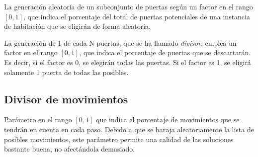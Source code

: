 La generación aleatoria de un subconjunto de puertas según un factor en el rango $[0,1]$, que indica el porcentaje del total de puertas potenciales de una instancia de habitación que se eligirán de forma aleatoria.

La generación de 1 de cada N puertas, que se ha llamado \emph{divisor}, emplea un factor en el rango $[0,1]$, que indica el porcentaje de puertas que se descartarán. Es decir, si el factor es 0, se elegirán todas las puertas. Si el factor es 1, se eligirá solamente 1 puerta de todas las posibles.

\subsection{Divisor de movimientos}

Parámetro en el rango $[0,1]$ que indica el porcentaje de movimientos que se tendrán en cuenta en cada paso. Debido a que se baraja aleatoriamente la lista de posibles movimientos, este parámetro permite una calidad de las soluciones bastante buena, no afectándola demasiado.

